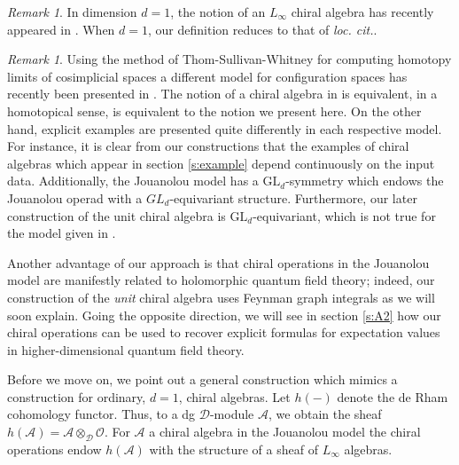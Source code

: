 \documentclass[11pt]{amsart}
\theoremstyle{definition}
\theoremstyle{remark}
\newtheorem{rem}[thm]{Remark}
\numberwithin{equation}{section}
\newcommand{\cA}{\mathcal{A}}
\begin{document}
\begin{rem}
  In dimension $d=1$, the notion of an $L_\infty$ chiral algebra has recently appeared in \cite{malikov2024homotopy}. When $d=1$, our definition reduces to that of \textit{loc. cit.}.
\end{rem}

\begin{rem}\label{rem:CompareJouanolouPoly}
  Using the method of Thom-Sullivan-Whitney for computing homotopy limits of cosimplicial spaces a different model for
  configuration spaces has recently been presented in \cite{FGY}.
  The notion of a chiral algebra in \cite{FGY} is equivalent, in a homotopical sense, is equivalent to the notion we
  present here.
  On the other hand, explicit examples are presented quite differently in each respective model.
  For instance, it is clear from our constructions that the examples of chiral algebras which appear in section
  \ref{s:example} depend continuously on the input data. 
  Additionally, the Jouanolou model has a $\mathrm{GL}_d$-symmetry which endows the Jouanolou operad with a
  $GL_d$-equivariant structure.
  Furthermore, our later construction of the unit chiral algebra is $\mathrm{GL}_d$-equivariant, which is not true for
  the model given in \cite{FGY}.
  
  Another advantage of our approach is that chiral operations in the Jouanolou model are manifestly related to
  holomorphic quantum field theory; indeed, our construction of the \textit{unit} chiral algebra uses Feynman graph
  integrals as we will soon explain.
  Going the opposite direction, we will see in section \ref{s:A2} how our chiral operations can be used to recover
  explicit formulas for expectation values in higher-dimensional quantum field theory.
\end{rem}

Before we move on, we point out a general construction which mimics a construction for ordinary, $d=1$, chiral
algebras.
Let $h(-)$ denote the de Rham cohomology functor.
Thus, to a dg $\mathcal{D}$-module $\mathcal{A}$, we obtain the sheaf $h(\mathcal{A}) = \cA\otimes_{\mathcal{\mathcal{D}}}\mathcal{O}$. For $\mathcal{A}$ a chiral algebra in the Jouanolou model the chiral operations endow $h(\mathcal{A})$ with
the structure of a sheaf of $L_\infty$ algebras.
\end{document}
